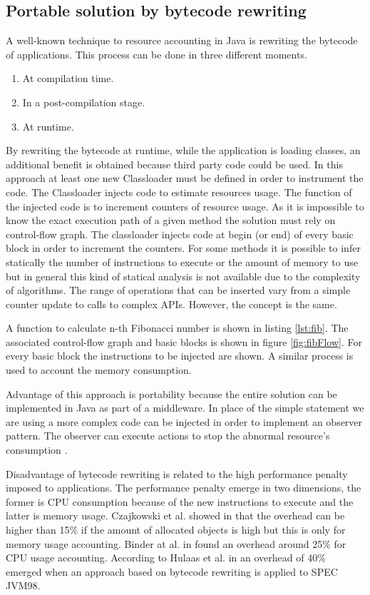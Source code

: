 \subsection{Portable solution by bytecode rewriting}
A well-known technique to resource accounting in Java is rewriting the bytecode of applications. This process can be done in three different moments.
\begin{enumerate}
\item At compilation time.
\item In a post-compilation stage.
\item At runtime. 
\end{enumerate}
By rewriting the bytecode at runtime, while the application is loading classes, an additional benefit is obtained because third party code could be used. In this approach at least one new Classloader must be defined in order to instrument the code. The Classloader injects code to estimate resources usage. The function of the injected code is to increment counters of resource usage. As it is impossible to know the exact execution path of a given method the solution must rely on control-flow graph. The classloader injects code at begin (or end) of every basic block in order to increment the counters. For some methods it is possible to infer statically the number of instructions to execute or the amount of memory to use but in general this kind of statical analysis is not available due to the complexity of algorithms. The range of operations that can be inserted vary from a simple counter update to calls to complex APIs. However, the concept is the same.

A function to calculate n-th Fibonacci number is shown in listing \ref{lst:fib}. The associated control-flow graph and basic blocks is shown in figure \ref{fig:fibFlow}. For every basic block the instructions to be injected are shown. A similar process is used to account the memory consumption.

Advantage of this approach is portability because the entire solution can be implemented in Java as part of a middleware. In place of the simple statement we are using a more complex code can be injected in order to implement an observer pattern. The observer can execute actions to stop the abnormal resource's consumption \cite{czajkowski_jres:_1998}.

Disadvantage of bytecode rewriting is related to the high performance penalty imposed to applications. The performance penalty emerge in two dimensions, the former is CPU consumption because of the new instructions to execute and the latter is memory usage. Czajkowski et al. showed in \cite{czajkowski_jres:_1998} that the overhead can be higher than 15\% if the amount of allocated objects is high but this is only for memory usage accounting. Binder at al. in \cite{binder_portable_2001} found an overhead around 25\% for CPU usage accounting. According to Hulaas et al. in \cite{Hulaas:2004:PTP:1014007.1014024} an overhead of 40\% emerged when an approach based on bytecode rewriting is applied to SPEC JVM98.

